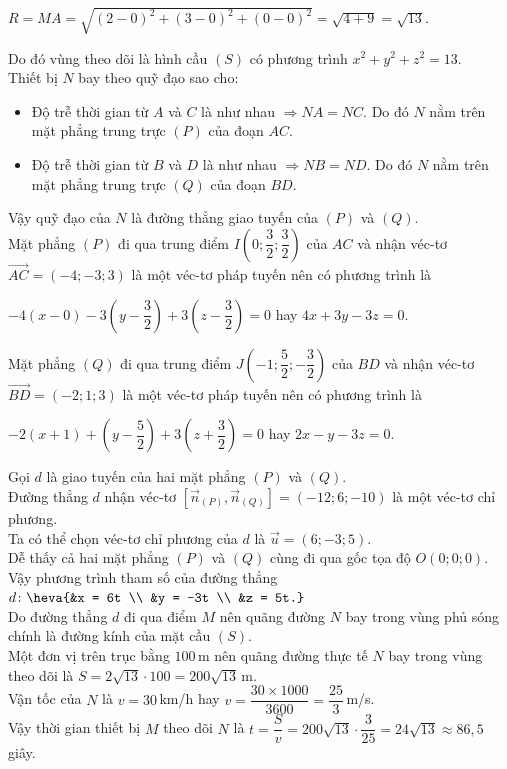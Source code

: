 \begin{bt}
{\begin{center}
			$R = MA = \sqrt{(2-0)^2 + (3-0)^2 + (0-0)^2}  =\sqrt{4 + 9} = \sqrt{13}$.
		\end{center}
		Do đó vùng theo dõi là hình cầu $(S)$ có  phương trình $x^2 + y^2 + z^2 = 13$.\\
		Thiết bị $N$ bay  theo quỹ đạo sao cho:
		\begin{itemize}
			\item Độ trễ thời gian từ $A$ và $C$ là như nhau $\Rightarrow NA = NC$. Do đó $N$ nằm trên mặt phẳng trung trực $(P)$ của  đoạn $AC$.
			\item Độ trễ thời gian từ $B$ và $D$ là như nhau $\Rightarrow NB = ND$. Do đó $N$ nằm trên mặt  phẳng trung trực $(Q)$ của đoạn $BD$.
		\end{itemize}
		Vậy quỹ đạo của $N$ là đường thẳng giao tuyến của $(P)$  và $(Q)$.\\
		Mặt phẳng $(P)$ đi qua trung điểm $I\left(0;\dfrac{3}{2};\dfrac{3}{2}\right)$ của $AC$ và nhận véc-tơ $\overrightarrow{AC}=(-4;-3;3)$ là một véc-tơ pháp tuyến nên có  phương trình là
		\begin{center}
			$-4(x-0)-3\left(y-\dfrac{3}{2}\right)+3\left(z-\dfrac{3}{2}\right)=0$ hay $4x + 3y - 3z =  0$.
		\end{center}
		Mặt phẳng $(Q)$ đi qua trung điểm $J\left(-1;\dfrac{5}{2};-\dfrac{3}{2}\right)$ của $BD$ và nhận véc-tơ $\overrightarrow{BD}=(-2;1;3)$ là một véc-tơ pháp  tuyến nên có phương trình là
		\begin{center}
			$-2(x+1)+\left(y-\dfrac{5}{2}\right)+3\left(z+\dfrac{3}{2}\right)=0$ hay $2x  - y - 3z = 0$.
		\end{center}
		Gọi $d$ là giao tuyến của hai mặt phẳng $(P)$  và $(Q)$.\\
		Đường thẳng  $d$ nhận véc-tơ $[\overrightarrow{n}_{(P)},\overrightarrow{n}_{(Q)}]=(-12;6;-10)$ là một véc-tơ chỉ phương.\\
		Ta có thể chọn véc-tơ chỉ phương của $d$ là  $\overrightarrow{u} = (6; -3; 5)$.\\
		Dễ thấy cả hai mặt phẳng $(P)$ và $(Q)$ cùng đi  qua gốc tọa độ $O(0;0;0)$.\\
		Vậy phương trình tham số của đường  thẳng $d \colon \heva{&x = 6t \\ &y = -3t \\ &z = 5t.}$\\
		Do đường thẳng $d$ đi qua điểm $M$ nên quãng đường $N$ bay trong vùng phủ sóng chính là đường kính của mặt  cầu $(S)$.\\
		Một đơn vị trên trục bằng $100$\,m nên  quãng đường thực tế $N$ bay trong vùng theo dõi là
		$S = 2\sqrt{13}  \cdot 100 = 200\sqrt{13}$\,m.\\
		Vận tốc của $N$  là $v = 30$\,km/h hay $v = \dfrac{30 \times 1000}{3600} = \dfrac{25}{3}$\,m/s.\\
		Vậy thời gian thiết bị $M$ theo dõi $N$ là $t=\dfrac{S}{v}=200\sqrt{13} \cdot \dfrac{3}{25}=24\sqrt{13}  \approx 86{,}5$ giây.
	} 
\end{bt}

